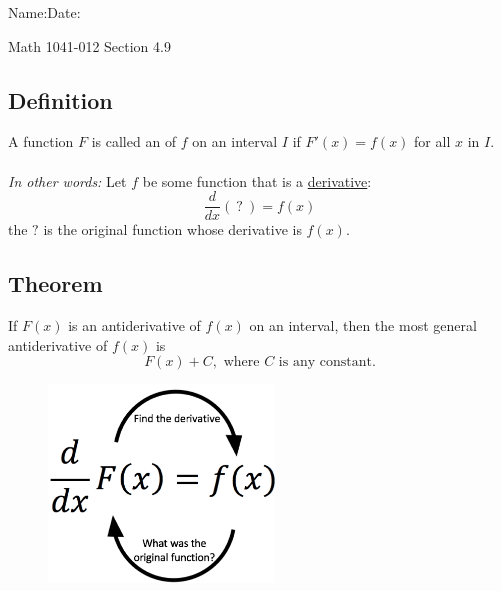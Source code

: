 \documentclass[10pt]{book}
\theoremstyle{definition}
\begin{document}
\begin{flushleft}
Name:\underline{\hspace{13cm}}Date:\underline{\hspace{2cm}}
\end{flushleft}
\begin{center}
{\Large Math 1041-012 \hspace{0.5cm} Section 4.9}
\end{center}

\begin{tcolorbox}
\subsection*{Definition}
A function $F$ is called an \underline{\hspace{5cm}} of $f$ on an interval $I$ if $F'(x)=f(x)$ for all $x$ in $I$.\\ \\
\textit{In other words:} Let $f$ be some function that is a \underline{derivative}:
\[
\frac{d}{dx}\left(\ ? \ \right)=f(x)
\]
the $?$ is the original function whose derivative is $f(x)$. 
\subsection*{Theorem}
If $F(x)$ is an antiderivative of $f(x)$ on an interval, then the most general antiderivative of $f(x)$ is
\[
F(x)+C,\textrm{ where $C$ is any constant.}
\]
\end{tcolorbox}
\begin{figure}[h!]
    \centering
    \includegraphics[width=6cm]{antiDer.png}
\end{figure}
\end{document}
